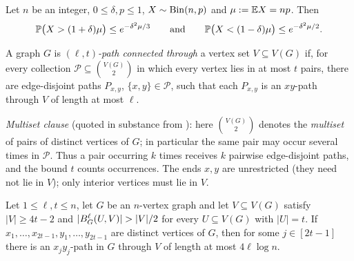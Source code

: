 \begin{citedresult}\label{s1:citChernoff}
Let $n$ be an integer, $0\le\delta,p\le1$, $X\sim\mathrm{Bin}(n,p)$ and $\mu\mathrel{:=}\mathbb{E}
X=np$. Then
\[
\mathbb{P}\bigl(X>(1+\delta)\mu\bigr)\le e^{-\delta^2\mu/3}
\qquad\text{and}\qquad
\mathbb{P}\bigl(X<(1-\delta)\mu\bigr)\le e^{-\delta^2\mu/2}.
\]
\end{citedresult}

\begin{citedresult}[{\cite[Definition~7]{BM}}]\label{s1:citDef7}
A graph $G$ is \emph{$(\ell,t)$-path connected through} a vertex set $V\subseteq
V(G)$ if, for every collection $\mathcal P\subseteq\binom{V(G)}{2}$ in which every
vertex lies in at most $t$ pairs, there are edge-disjoint paths $P_{x,y}$,
$\{x,y\}\in\mathcal P$, such that each $P_{x,y}$ is an $xy$-path through $V$ of
length at most $\ell$.

\emph{Multiset clause} (quoted in substance from \cite{BM}): here
$\binom{V(G)}{2}$ denotes the \emph{multiset} of pairs of distinct vertices of
$G$; in particular the same pair may occur several times in $\mathcal P$. Thus a
pair occurring $k$ times receives $k$ pairwise edge-disjoint paths, and the
bound $t$ counts occurrences. The ends $x,y$ are unrestricted (they need not lie
in $V$); only interior vertices must lie in $V$.
\end{citedresult}

\begin{citedresult}[{\cite[Proposition~8]{BM}}]\label{s1:citProp8}
Let $1\le\ell,t\le n$, let $G$ be an $n$-vertex graph and let $V\subseteq V(G)$
satisfy $|V|\ge4t-2$ and $|\Ball{\ell}{G}{U,V}|>|V|/2$ for every $U\subseteq
V(G)$ with $|U|=t$. If $x_1,\dots,x_{2t-1},y_1,\dots,y_{2t-1}$ are distinct
vertices of $G$, then for some $j\in[2t-1]$ there is an $x_jy_j$-path in $G$
through $V$ of length at most $4\ell\log n$.
\end{citedresult}

